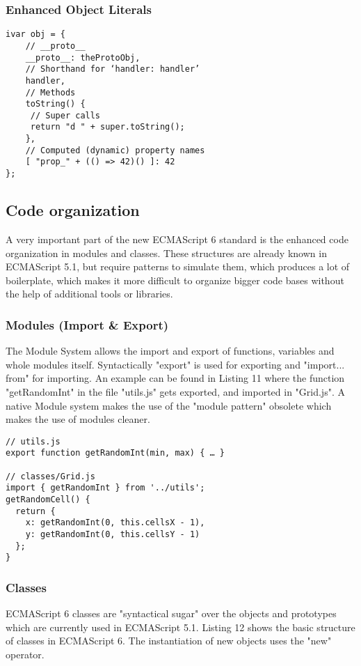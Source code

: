 \documentclass{bioinfo}
\begin{document}
\subsubsection{Enhanced Object Literals}

\begin{lstlisting}[caption= My Javascript Example]
ivar obj = {
    // __proto__
    __proto__: theProtoObj,
    // Shorthand for ‘handler: handler’
    handler,
    // Methods
    toString() {
     // Super calls
     return "d " + super.toString();
    },
    // Computed (dynamic) property names
    [ "prop_" + (() => 42)() ]: 42
};
\end{lstlisting}
\subsection{Code organization}
A very important part of the new ECMAScript 6 standard is the enhanced code organization in modules and classes. These structures are already known
in ECMAScript 5.1, but require patterns to simulate them, which produces a lot of boilerplate, which makes it more difficult to organize bigger code bases
without the help of additional tools or libraries.
\subsubsection{Modules (Import \& Export)}
The Module System allows the import and export of functions, variables and whole modules itself. Syntactically "export" is used for exporting and "import... from"
for importing. An example can be found in Listing 11 where the function "getRandomInt" in the file "utils.js" gets exported, and imported in "Grid.js".
A native Module system makes the use of the "module pattern" obsolete which makes the use of modules cleaner.

\begin{lstlisting}[caption= My Javascript Example]
// utils.js
export function getRandomInt(min, max) { … }

// classes/Grid.js
import { getRandomInt } from '../utils';
getRandomCell() {
  return {
    x: getRandomInt(0, this.cellsX - 1),
    y: getRandomInt(0, this.cellsY - 1)
  };
}
\end{lstlisting}

\subsubsection{Classes}
ECMAScript 6 classes are "syntactical sugar" over the objects and prototypes which are currently used in ECMAScript 5.1. 
Listing 12 shows the basic structure of classes in ECMAScript 6. The instantiation of new objects uses the "new" operator.
\end{document}
